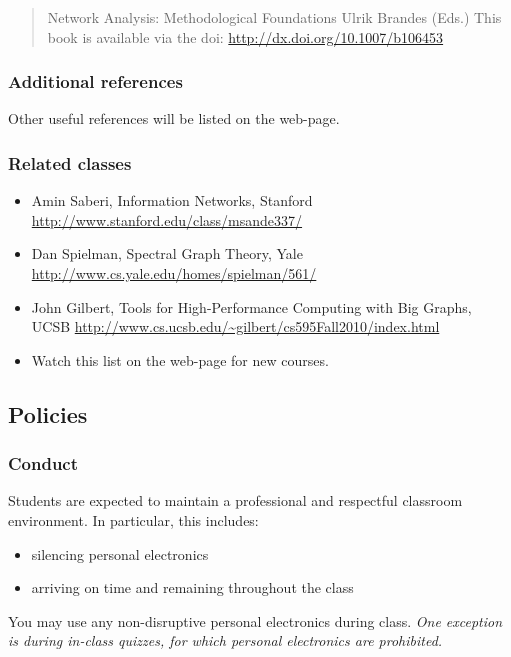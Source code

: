\documentclass{article}
\begin{document}
\begin{quote}%
Network Analysis: Methodological Foundations Ulrik Brandes (Eds.) This book is available via the doi: \url{http://dx.doi.org/10.1007/b106453}


\end{quote}
\hypertarget{additional_references_12}{}\subsubsection*{{Additional references}}\label{additional_references_12}

Other useful references will be listed on the web-page.

\hypertarget{related_classes_13}{}\subsubsection*{{Related classes}}\label{related_classes_13}

\begin{itemize}%
\item Amin Saberi, Information Networks, Stanford \url{http://www.stanford.edu/class/msande337/}
\item Dan Spielman, Spectral Graph Theory, Yale \url{http://www.cs.yale.edu/homes/spielman/561/}
\item John Gilbert, Tools for High-Performance Computing with Big Graphs, UCSB \url{http://www.cs.ucsb.edu/~gilbert/cs595Fall2010/index.html}
\item Watch this list on the web-page for new courses.

\end{itemize}
\hypertarget{policies_14}{}\subsection*{{Policies}}\label{policies_14}

\hypertarget{conduct_15}{}\subsubsection*{{Conduct}}\label{conduct_15}

Students are expected to maintain a professional and respectful classroom environment. In particular, this includes:

\begin{itemize}%
\item silencing personal electronics
\item arriving on time and remaining throughout the class

\end{itemize}
You may use any non-disruptive personal electronics during class. \emph{One exception is during in-class quizzes, for which personal electronics are prohibited.}
\end{document}
